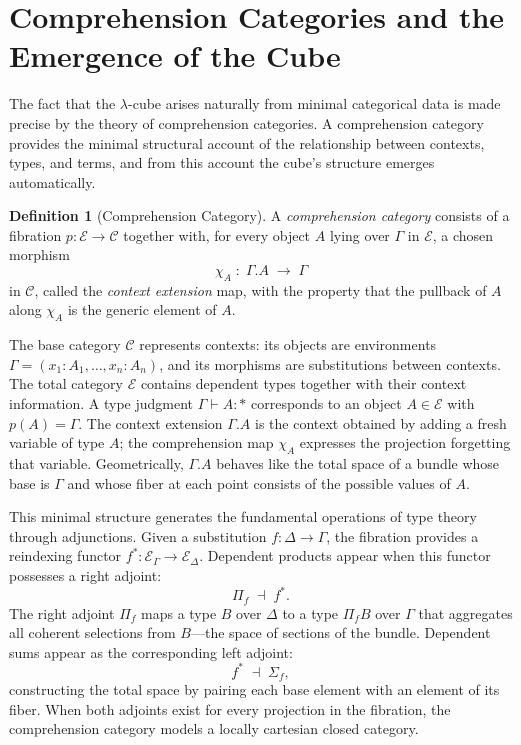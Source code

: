\documentclass[12pt,a4paper]{article}
\theoremstyle{plain}
\theoremstyle{definition}
\newtheorem{definition}[theorem]{Definition}
\newcommand{\E}{\mathcal{E}}
\newcommand{\C}{\mathcal{C}}
\begin{document}
\section{Comprehension Categories and the Emergence of the Cube}

The fact that the $\lambda$-cube arises naturally from minimal categorical
data is made precise by the theory of comprehension categories. A comprehension
category provides the minimal structural account of the relationship between
contexts, types, and terms, and from this account the cube's structure emerges
automatically.

\begin{definition}[Comprehension Category]
A \emph{comprehension category} consists of a fibration $p : \E \to \C$
together with, for every object $A$ lying over $\Gamma$ in $\E$, a chosen
morphism
\[
\chi_A \;:\; \Gamma.A \;\longrightarrow\; \Gamma
\]
in $\C$, called the \emph{context extension} map, with the property that the
pullback of $A$ along $\chi_A$ is the generic element of $A$.
\end{definition}

The base category $\C$ represents contexts: its objects are environments $\Gamma
= (x_1 : A_1, \dots, x_n : A_n)$, and its morphisms are substitutions between
contexts. The total category $\E$ contains dependent types together with their
context information. A type judgment $\Gamma \vdash A : *$ corresponds to an
object $A \in \E$ with $p(A) = \Gamma$. The context extension $\Gamma.A$ is
the context obtained by adding a fresh variable of type $A$; the comprehension
map $\chi_A$ expresses the projection forgetting that variable. Geometrically,
$\Gamma.A$ behaves like the total space of a bundle whose base is $\Gamma$ and
whose fiber at each point consists of the possible values of $A$.

This minimal structure generates the fundamental operations of type theory
through adjunctions. Given a substitution $f : \Delta \to \Gamma$, the
fibration provides a reindexing functor $f^* : \E_\Gamma \to \E_\Delta$.
Dependent products appear when this functor possesses a right adjoint:
\[
\Pi_f \;\dashv\; f^*.
\]
The right adjoint $\Pi_f$ maps a type $B$ over $\Delta$ to a type $\Pi_f B$
over $\Gamma$ that aggregates all coherent selections from $B$---the space
of sections of the bundle. Dependent sums appear as the corresponding left
adjoint:
\[
f^* \;\dashv\; \Sigma_f,
\]
constructing the total space by pairing each base element with an element of
its fiber. When both adjoints exist for every projection in the fibration,
the comprehension category models a locally cartesian closed category.
\end{document}
